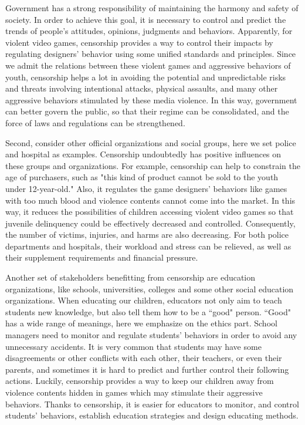 Government has a strong responsibility of maintaining the harmony and safety of society. In order to achieve this goal, it is necessary to control and predict the trends of people's attitudes, opinions, judgments and behaviors.  Apparently, for violent video games, censorship provides a way to control their impacts by regulating designers' behavior using some unified standards and principles. Since we admit the relations between these violent games and aggressive behaviors of youth, censorship helps a lot in avoiding the potential and unpredictable risks and threats involving intentional attacks, physical assaults, and many other aggressive behaviors stimulated by these media violence. In this way, government can better govern the public, so that their regime can be consolidated, and the force of laws and regulations can be strengthened.

Second, consider other official organizations and social groups, here we set police and hospital as examples. Censorship undoubtedly has positive influences on these groups and organizations. For example, censorship can help to constrain the age of purchasers, such as "this kind of product cannot be sold to the youth under 12-year-old." Also, it regulates the game designers' behaviors like games with too much blood and violence contents cannot come into the market. In this way, it reduces the possibilities of children accessing violent video games so that juvenile delinquency could be effectively decreased and controlled. Consequently, the number of victims, injuries, and harms are also decreasing. For both police departments and hospitals, their workload and stress can be relieved, as well as their supplement requirements and financial pressure.

Another set of stakeholders benefitting from censorship are education organizations, like schools, universities, colleges and some other social education organizations. When educating our children, educators not only aim to teach students new knowledge, but also tell them how to be a ``good" person. ``Good" has a wide range of meanings, here we emphasize on the ethics part. School managers need to monitor and regulate students' behaviors in order to avoid any unnecessary accidents. It is very common that students may have some disagreements or other conflicts with each other, their teachers, or even their parents, and sometimes it is hard to predict and further control their following actions. Luckily, censorship provides a way to keep our children away from violence contents hidden in games which may stimulate their aggressive behaviors. Thanks to censorship, it is easier for educators to monitor, and control students' behaviors, establish education strategies and design educating methods. 

